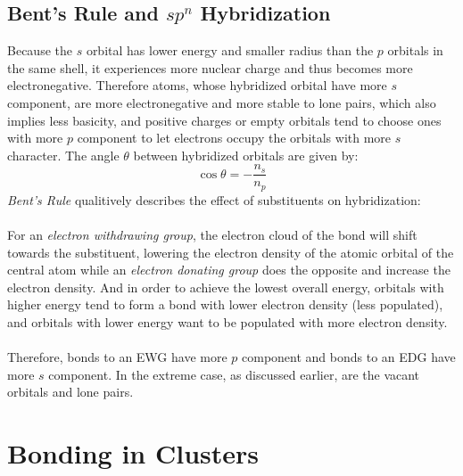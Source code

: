 \subsection{Bent's Rule and $sp^n$ Hybridization}

	Because the $s$ orbital has lower energy and smaller radius than the $p$ orbitals in the same shell, 
	it experiences more nuclear charge and thus becomes more electronegative. 
	Therefore atoms, whose hybridized orbital have more $s$ component, are more electronegative and more stable to lone pairs, 
	which also implies less basicity, 
	and positive charges or empty orbitals tend to choose ones with more $p$ component to let electrons occupy the orbitals with more $s$ character.
	The angle $\theta$ between hybridized orbitals are given by:
	\[\cos\theta = -\frac{n_s}{n_p}\]
	\emph{Bent's Rule} qualitively describes the effect of substituents on hybridization:\\\ \\
	For an \emph{electron withdrawing group}, the electron cloud of the bond will shift towards the substituent, 
	lowering the electron density of the atomic orbital of the central atom 
	while an \emph{electron donating group} does the opposite and increase the electron density.
	And in order to achieve the lowest overall energy, 
	orbitals with higher energy tend to form a bond with lower electron density (less populated), 
	and orbitals with lower energy want to be populated with more electron density.\\\ \\
	Therefore, bonds to an EWG have more $p$ component and bonds to an EDG have more $s$ component.
	In the extreme case, as discussed earlier, are the vacant orbitals and lone pairs.
	
\section{Bonding in Clusters}
